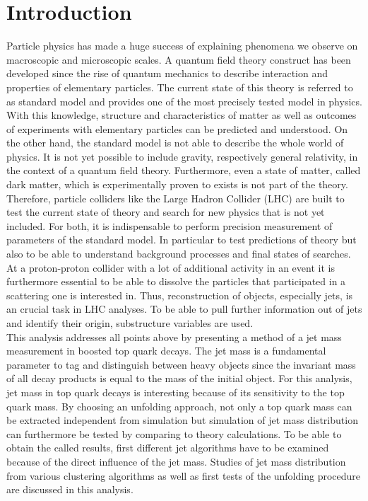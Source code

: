 \chapter{Introduction}
	Particle physics has made a huge success of explaining phenomena we observe on macroscopic and microscopic scales. A quantum field theory construct has been developed since the rise of quantum mechanics to describe interaction and properties of elementary particles. The current state of this theory is referred to as standard model and provides one of the most precisely tested model in physics. With this knowledge, structure and characteristics of matter as well as outcomes of experiments with elementary particles can be predicted and understood. On the other hand, the standard model is not able to describe the whole world of physics. It is not yet possible to include gravity, respectively general relativity, in the context of a quantum field theory. Furthermore, even a state of matter, called dark matter, which is experimentally proven to exists is not part of the theory. Therefore, particle colliders like the Large Hadron Collider (LHC) are built to test the current state of theory and search for new physics that is not yet included. For both, it is indispensable to perform precision measurement of parameters of the standard model. In particular to test predictions of theory but also to be able to understand background processes and final states of searches. At a proton-proton collider with a lot of additional activity in an event it is furthermore essential to be able to dissolve the particles that participated in a scattering one is interested in. Thus, reconstruction of objects, especially jets, is an crucial task in LHC analyses. To be able to pull further information out of jets and identify their origin, substructure variables are used. \\
	This analysis addresses all points above by presenting a method of a jet mass measurement in boosted top quark decays. The jet mass is a fundamental parameter to tag and distinguish between heavy objects since the invariant mass of all decay products is equal to the mass of the initial object. For this analysis, jet mass in top quark decays is interesting because of its sensitivity to the top quark mass. By choosing an unfolding approach, not only a top quark mass can be extracted independent from simulation but simulation of jet mass distribution can furthermore be tested by comparing to theory calculations. To be able to obtain the called results, first different jet algorithms have to be examined because of the direct influence of the jet mass. Studies of jet mass distribution from various clustering algorithms as well as first tests of the unfolding procedure are discussed in this analysis.
